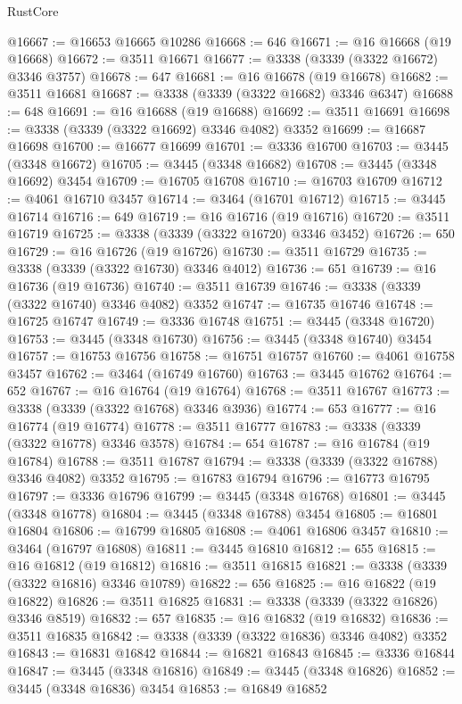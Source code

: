\begin{lexlean}{RustCore}
\begin{coremodule}
@16667 := @16653 @16665 @10286
@16668 := 646
@16671 := @16 @16668 (@19 @16668)
@16672 := @3511 @16671
@16677 := @3338 (@3339 (@3322 @16672) @3346 @3757)
@16678 := 647
@16681 := @16 @16678 (@19 @16678)
@16682 := @3511 @16681
@16687 := @3338 (@3339 (@3322 @16682) @3346 @6347)
@16688 := 648
@16691 := @16 @16688 (@19 @16688)
@16692 := @3511 @16691
@16698 := @3338 (@3339 (@3322 @16692) @3346 @4082) @3352
@16699 := @16687 @16698
@16700 := @16677 @16699
@16701 := @3336 @16700
@16703 := @3445 (@3348 @16672)
@16705 := @3445 (@3348 @16682)
@16708 := @3445 (@3348 @16692) @3454
@16709 := @16705 @16708
@16710 := @16703 @16709
@16712 := @4061 @16710 @3457
@16714 := @3464 (@16701 @16712)
@16715 := @3445 @16714
@16716 := 649
@16719 := @16 @16716 (@19 @16716)
@16720 := @3511 @16719
@16725 := @3338 (@3339 (@3322 @16720) @3346 @3452)
@16726 := 650
@16729 := @16 @16726 (@19 @16726)
@16730 := @3511 @16729
@16735 := @3338 (@3339 (@3322 @16730) @3346 @4012)
@16736 := 651
@16739 := @16 @16736 (@19 @16736)
@16740 := @3511 @16739
@16746 := @3338 (@3339 (@3322 @16740) @3346 @4082) @3352
@16747 := @16735 @16746
@16748 := @16725 @16747
@16749 := @3336 @16748
@16751 := @3445 (@3348 @16720)
@16753 := @3445 (@3348 @16730)
@16756 := @3445 (@3348 @16740) @3454
@16757 := @16753 @16756
@16758 := @16751 @16757
@16760 := @4061 @16758 @3457
@16762 := @3464 (@16749 @16760)
@16763 := @3445 @16762
@16764 := 652
@16767 := @16 @16764 (@19 @16764)
@16768 := @3511 @16767
@16773 := @3338 (@3339 (@3322 @16768) @3346 @3936)
@16774 := 653
@16777 := @16 @16774 (@19 @16774)
@16778 := @3511 @16777
@16783 := @3338 (@3339 (@3322 @16778) @3346 @3578)
@16784 := 654
@16787 := @16 @16784 (@19 @16784)
@16788 := @3511 @16787
@16794 := @3338 (@3339 (@3322 @16788) @3346 @4082) @3352
@16795 := @16783 @16794
@16796 := @16773 @16795
@16797 := @3336 @16796
@16799 := @3445 (@3348 @16768)
@16801 := @3445 (@3348 @16778)
@16804 := @3445 (@3348 @16788) @3454
@16805 := @16801 @16804
@16806 := @16799 @16805
@16808 := @4061 @16806 @3457
@16810 := @3464 (@16797 @16808)
@16811 := @3445 @16810
@16812 := 655
@16815 := @16 @16812 (@19 @16812)
@16816 := @3511 @16815
@16821 := @3338 (@3339 (@3322 @16816) @3346 @10789)
@16822 := 656
@16825 := @16 @16822 (@19 @16822)
@16826 := @3511 @16825
@16831 := @3338 (@3339 (@3322 @16826) @3346 @8519)
@16832 := 657
@16835 := @16 @16832 (@19 @16832)
@16836 := @3511 @16835
@16842 := @3338 (@3339 (@3322 @16836) @3346 @4082) @3352
@16843 := @16831 @16842
@16844 := @16821 @16843
@16845 := @3336 @16844
@16847 := @3445 (@3348 @16816)
@16849 := @3445 (@3348 @16826)
@16852 := @3445 (@3348 @16836) @3454
@16853 := @16849 @16852

\end{coremodule}
\end{lexlean}
